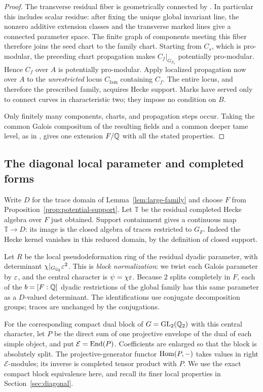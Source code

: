\begin{proof}
The transverse residual fiber is geometrically connected by
\cite[Lemma~7.5]{FM2}.  In particular this includes scalar residue:
after fixing the unique global invariant line, the nonzero additive
extension classes and the transverse marked lines give a connected
parameter space.  The finite graph of components meeting this fiber
therefore joins the seed chart to the family chart.  Starting from
$C_s$, which is pro-modular, the preceding chart propagation makes
$C_f|_{G_{F_0}}$ potentially pro-modular.  Hence $C_f$ over $A$ is
potentially pro-modular.  Apply localized propagation now over $A$
to the \emph{unrestricted} locus $C_{\mathrm{fam}}$ containing
$C_f$.  The entire locus, and therefore the prescribed family,
acquires Hecke support.  Marks have served only to connect curves
in characteristic two; they impose no condition on $B$.

Only finitely many components, charts, and propagation steps occur.
Taking the common Galois compositum of the resulting fields and a
common deeper tame level, as in \cite[Lemma~4.6 and Section~7.4]{FM2},
gives one extension $F/\mathbb Q$ with all the stated properties.
\end{proof}

\subsection{The diagonal local parameter and completed forms}

Write $D$ for the trace domain of Lemma~\ref{lem:large-family} and
choose $F$ from Proposition~\ref{prop:potential-support}.  Let
$\mathbb T$ be the residual completed Hecke algebra over $F$ just
obtained.  Support containment gives a continuous map
$\mathbb T\to D$: its image is the closed algebra of traces
restricted to $G_F$.  Indeed the Hecke kernel vanishes in this
reduced domain, by the definition of closed support.

Let $R$ be the local pseudodeformation ring of the residual dyadic
parameter, with determinant $\chi|_{G_{\mathbb Q_2}}\varepsilon^2$.  This is
\emph{block normalization}: we twist each Galois parameter by
$\varepsilon$, and the central character is
$\psi=\chi\varepsilon$.  Because $2$ splits completely in $F$, each of
the $b=[F:\mathbb Q]$ dyadic restrictions of the global family has this
same parameter as a $D$-valued determinant.  The identifications use conjugate decomposition
groups; traces are unchanged by the conjugations.

For the corresponding compact dual block of
$G=\operatorname{GL}_2(\mathbb Q_2)$ with this central character, let $P$ be the direct
sum of one projective envelope of the dual of each simple object,
and put $\mathcal E=\operatorname{End}(P)$.  Coefficients are enlarged so that
the block is absolutely split.  The projective-generator functor
$\operatorname{Hom}(P,-)$ takes values in right $\mathcal E$-modules; its inverse
is completed tensor product with $P$.  We use the exact compact
block equivalence here, and recall its finer local properties in
Section~\ref{sec:diagonal}.


